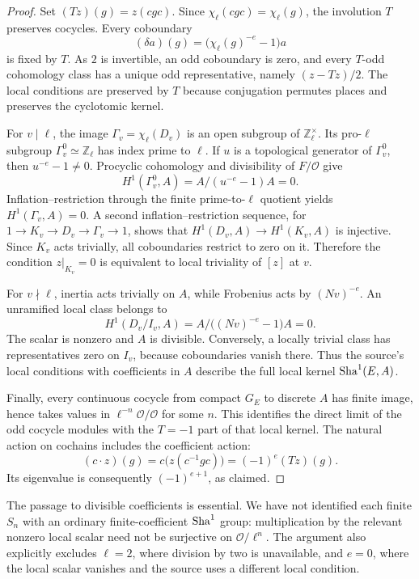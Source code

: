 \begin{proof}
Set $(Tz)(g)=z(cgc)$. Since $\chi_\ell(cgc)=\chi_\ell(g)$, the involution
$T$ preserves cocycles. Every coboundary
\[
 (\delta a)(g)=\bigl(\chi_\ell(g)^{-e}-1\bigr)a
\]
is fixed by $T$. As $2$ is invertible, an odd coboundary is zero, and every
$T$-odd cohomology class has a unique odd representative, namely
$(z-Tz)/2$. The local conditions are preserved by $T$ because conjugation
permutes places and preserves the cyclotomic kernel.

For $v\mid\ell$, the image
$\Gamma_v=\chi_\ell(D_v)$ is an open subgroup of
$\mathbb Z_\ell^\times$. Its pro-$\ell$ subgroup $\Gamma_v^0\simeq
\mathbb Z_\ell$ has index prime to $\ell$. If $u$ is a topological
generator of $\Gamma_v^0$, then $u^{-e}-1\ne0$. Procyclic
cohomology and divisibility of $F/\mathcal O$ give
\[
 H^1(\Gamma_v^0,A)=A/(u^{-e}-1)A=0.
\]
Inflation--restriction through the finite prime-to-$\ell$ quotient yields
$H^1(\Gamma_v,A)=0$. A second inflation--restriction sequence, for
$1\to K_v\to D_v\to\Gamma_v\to1$, shows that
$H^1(D_v,A)\to H^1(K_v,A)$ is injective. Since $K_v$ acts trivially, all
coboundaries restrict to zero on it. Therefore the condition $z|_{K_v}=0$
is equivalent to local triviality of $[z]$ at $v$.

For $v\nmid\ell$, inertia acts trivially on $A$, while Frobenius acts by
$(Nv)^{-e}$. An unramified local class belongs to
\[
 H^1(D_v/I_v,A)=A/\bigl((Nv)^{-e}-1\bigr)A=0.
\]
The scalar is nonzero and $A$ is divisible. Conversely, a locally trivial
class has representatives zero on $I_v$, because coboundaries vanish there.
Thus the source's local conditions with coefficients in $A$ describe the
full local kernel $\operatorname{Sha}^1(E,A)$.

Finally, every continuous cocycle from compact $G_E$ to discrete $A$ has
finite image, hence takes values in
$\ell^{-n}\mathcal O/\mathcal O$ for some $n$. This identifies the direct
limit of the odd cocycle modules with the $T=-1$ part of that local kernel.
The natural action on cochains includes the coefficient action:
\[
 (c\cdot z)(g)=c\bigl(z(c^{-1}gc)\bigr)=(-1)^e(Tz)(g).
\]
Its eigenvalue is consequently $(-1)^{e+1}$, as claimed.
\end{proof}

The passage to divisible coefficients is essential. We have not identified
each finite $S_n$ with an ordinary finite-coefficient $\operatorname{Sha}^1$ group:
multiplication by the relevant nonzero local scalar need not be
surjective on $\mathcal O/\ell^n$. The argument also explicitly excludes
$\ell=2$, where division by two is unavailable, and $e=0$, where the
local scalar vanishes and the source uses a different local condition.

